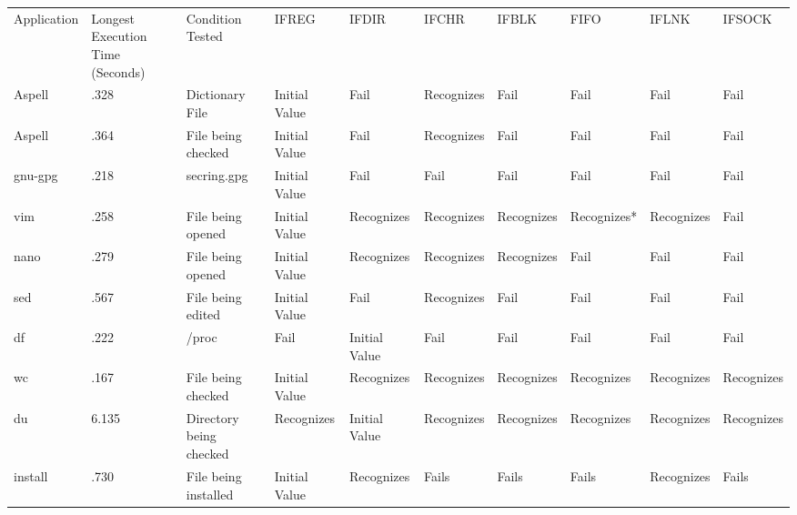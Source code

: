     \begin{table*}[t]
        \scriptsize{}
        \begin{tabular}{l  l  l  l  l  l  l  l  l  l}
        \toprule{}
          Application & Longest Execution Time (Seconds) & Condition Tested           & IFREG        & IFDIR        & IFCHR     & IFBLK    & FIFO      & IFLNK    & IFSOCK\\
          Aspell      & .328                             & Dictionary File            & Initial Value  & Fail           & Recognizes  & Fail       & Fail        & Fail       & Fail\\
          Aspell      & .364                             & File being checked         & Initial Value  & Fail           & Recognizes  & Fail       & Fail        & Fail       & Fail\\
          gnu-gpg     & .218                             & secring.gpg                & Initial Value  & Fail           & Fail        & Fail       & Fail        & Fail       & Fail\\
          vim         & .258                             & File being opened          & Initial Value  & Recognizes     & Recognizes  & Recognizes & Recognizes* & Recognizes & Fail\\
          nano        & .279                             & File being opened          & Initial Value  & Recognizes     & Recognizes  & Recognizes & Fail        & Fail       & Fail\\
          sed         & .567                             & File being edited          & Initial Value  & Fail           & Recognizes  & Fail       & Fail        & Fail       & Fail\\
          df          & .222                             & /proc                      & Fail           & Initial Value  & Fail        & Fail       & Fail        & Fail       & Fail\\
          wc          & .167                             & File being checked         & Initial Value  & Recognizes     & Recognizes  & Recognizes & Recognizes  & Recognizes & Recognizes\\
          du          & 6.135                            & Directory being checked    & Recognizes     & Initial Value  & Recognizes  & Recognizes & Recognizes  & Recognizes & Recognizes\\
          install     & .730                             & File being installed       & Initial Value  & Recognizes     & Fails       & Fails      & Fails       & Recognizes & Fails\\

\end{tabular}
\end{table*}
